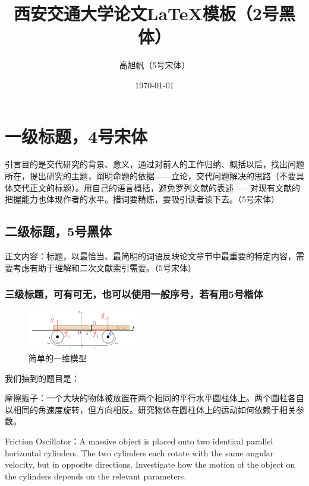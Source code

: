 \documentclass[UTF8,a4paper,12pt,twocolumn]{ctexart}
\title{西安交通大学论文\LaTeX 模板（2号黑体）} %
\author{高旭帆（5号宋体）}
\institute{（西安交通大学，生命学院，西安\hspace{0.5em}710049）（小5号宋体）}
\date{\today}
\begin{document}
\maketitle
\thispagestyle{fancy}
\pagestyle{empty}
\wuhao

\section{一级标题，4号宋体}
引言目的是交代研究的背景、意义，通过对前人的工作归纳、概括以后，找出问题所在，提出研究的主题，阐明命题的依据——立论，交代问题解决的思路（不要具体交代正文的标题）。用自己的语言概括，避免罗列文献的表述——对现有文献的把握能力也体现作者的水平。措词要精炼，要吸引读者读下去。（5号宋体）

\subsection{二级标题，5号黑体}

正文内容：标题，以最恰当、最简明的词语反映论文章节中最重要的特定内容，需要考虑有助于理解和二次文献索引需要。（5号宋体）

\subsubsection{三级标题，可有可无，也可以使用一般序号，若有用5号楷体}

\begin{figure}[!h]
	\centering
	\includegraphics[width=0.45\textwidth]{1d_model.png}
	\caption{简单的一维模型}\label{fig:1d_model}
\end{figure}

我们抽到的题目是：

\vspace{0.5em}
\noindent\begin{tcolorbox}
	\fangsong
	摩擦振子：一个大块的物体被放置在两个相同的平行水平圆柱体上。两个圆柱各自以相同的角速度旋转，但方向相反。研究物体在圆柱体上的运动如何依赖于相关参数。
	
	Friction Oscillator：A massive object is placed onto two identical parallel horizontal cylinders. The two cylinders each rotate with the same angular velocity, but in opposite directions. Investigate how the motion of the object on the cylinders depends on the relevant parameters.
\end{tcolorbox}
\songti
\end{document}
